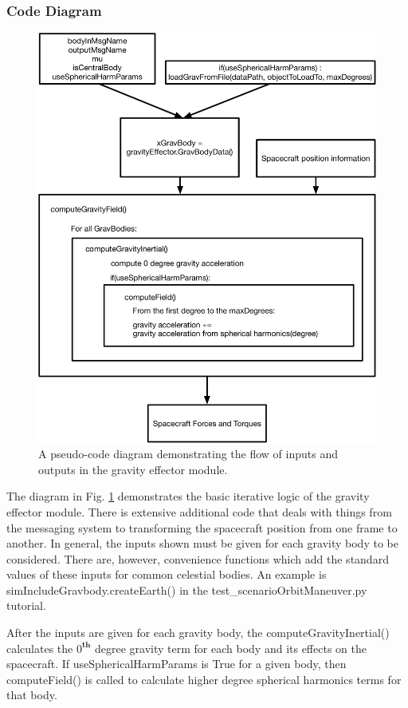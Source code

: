 \subsubsection{Code Diagram}

\begin{figure}[H]
	\centering \includegraphics[height=0.8\textwidth, keepaspectratio]{Figures/codeFlow.pdf}
	\caption{A pseudo-code diagram demonstrating the flow of inputs and outputs in the gravity effector module.}
	\label{img:codeFlow}
\end{figure}

The diagram in Fig. \ref{img:codeFlow} demonstrates the basic iterative logic of the gravity effector module. There is extensive additional code that deals with things from the messaging system to transforming the spacecraft position from one frame to another. In general, the inputs shown must be given for each gravity body to be considered. There are, however, convenience functions which add the standard values of these inputs for common celestial bodies. An example is simIncludeGravbody.createEarth() in the test\_scenarioOrbitManeuver.py tutorial.

After the inputs are given for each gravity body, the computeGravityInertial() calculates the $0^{\textbf{th}}$ degree gravity term for each body and its effects on the spacecraft. If useSphericalHarmParams is True for a given body, then computeField() is called to calculate higher degree spherical harmonics terms for that body.
